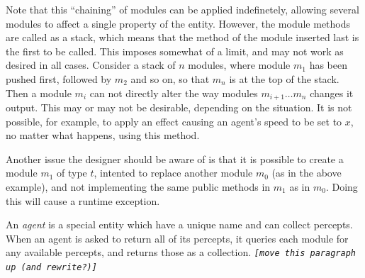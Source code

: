 Note that this ``chaining'' of modules can be applied indefinetely,
allowing several modules to affect a single property of the entity.
However, the module methods are called as a stack, which means that
the method of the module inserted last is the first to be called.
This imposes somewhat of a limit, and may not work as desired in all
cases. Consider a stack of $n$ modules, where module $m_{1}$ has
been pushed first, followed by $m_{2}$ and so on, so that $m_{n}$
is at the top of the stack. Then a module $m_{i}$ can not directly
alter the way modules $m_{i+1}\dots m_{n}$ changes it output. This
may or may not be desirable, depending on the situation. It is not
possible, for example, to apply an effect causing an agent's speed
to be set to $x$, no matter what happens, using this method.

Another issue the designer should be aware of is that it is possible
to create a module $m_{1}$ of type $t$, intented to replace another
module $m_{0}$ (as in the above example), and not implementing the
same public methods in $m_{1}$ as in $m_{0}$. Doing this will cause
a runtime exception.

An \emph{agent} is a special entity which have a unique name and can
collect percepts. When an agent is asked to return all of its percepts,
it queries each module for any available percepts, and returns those
as a collection. \texttt{\emph{{[}move this paragraph up (and rewrite?){]}}}
